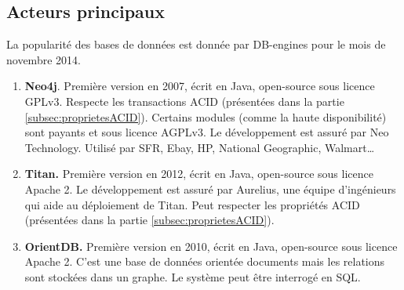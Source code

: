 \subsection{Acteurs principaux}
	La popularité des bases de données est donnée par DB-engines\cite{db_engines_key_value} pour le mois de novembre 2014.

	\begin{enumerate}
		\item \textbf{Neo4j}. Première version en 2007, écrit en Java, open-source sous licence GPLv3. Respecte les transactions ACID (présentées dans la partie \ref{subsec:proprietesACID}). Certains modules (comme la haute disponibilité) sont payants et sous licence AGPLv3. Le développement est assuré par Neo Technology. Utilisé par SFR, Ebay, HP, National Geographic, Walmart\dots
		\item \textbf{Titan.} Première version en 2012, écrit en Java, open-source sous licence Apache 2. Le développement est assuré par Aurelius, une équipe d'ingénieurs qui aide au déploiement de Titan. Peut respecter les propriétés ACID (présentées dans la partie \ref{subsec:proprietesACID}).
		\item \textbf{OrientDB.} Première version en 2010, écrit en Java, open-source sous licence Apache 2. C'est une base de données orientée documents mais les relations sont stockées dans un graphe. Le système peut être interrogé en SQL.
	\end{enumerate}
